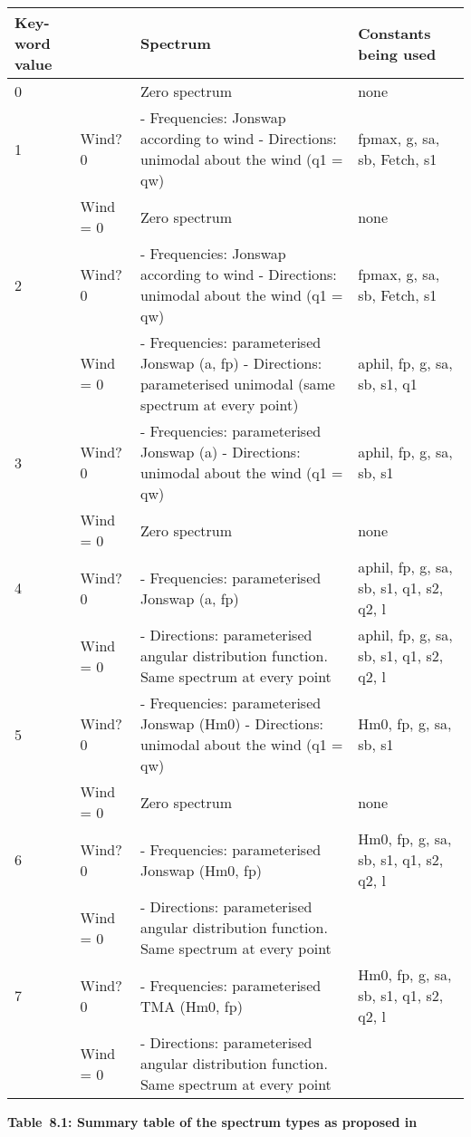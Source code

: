 \begin{tabular}{|p{0.5in}|p{0.5in}|p{2.2in}|p{0.8in}|} \hline
Key-word value &  & Spectrum & Constants being used \\ \hline
0 &  & Zero spectrum & none \\ \hline
1 & Wind? 0 & - Frequencies: Jonswap according to wind  - Directions: unimodal about the wind (q1 = qw) & fpmax, g, sa, sb, Fetch, s1 \\ \hline
 & Wind = 0 & Zero spectrum & none \\ \hline
2 & Wind? 0 & - Frequencies: Jonswap according to wind - Directions: unimodal about the wind (q1 = qw) & fpmax, g, sa, sb, Fetch, s1 \\ \hline
 & Wind = 0 & - Frequencies: parameterised Jonswap (a, fp) - Directions: parameterised unimodal (same spectrum at every point) & aphil, fp, g, sa, sb, s1, q1 \\ \hline
3 & Wind? 0 & - Frequencies: parameterised Jonswap (a) - Directions: unimodal about the wind (q1 = qw) & aphil, fp, g, sa, sb, s1 \\ \hline
 & Wind = 0 & Zero spectrum & none \\ \hline
4 & Wind? 0 & - Frequencies: parameterised Jonswap (a, fp) & aphil, fp, g, sa, sb, s1, q1, s2, q2, l \\ \hline
 & Wind = 0 & - Directions: parameterised angular distribution function. Same spectrum at every point & aphil, fp, g, sa, sb, s1, q1, s2, q2, l \\ \hline
5 & Wind? 0 & - Frequencies: parameterised Jonswap (Hm0) - Directions: unimodal about the wind  (q1 = qw) & Hm0, fp, g, sa, sb, s1 \\ \hline
 & Wind = 0 & Zero spectrum & none \\ \hline
6 & Wind? 0 & - Frequencies: parameterised Jonswap  (Hm0, fp) & Hm0, fp, g, sa, sb, s1, q1, s2, q2, l \\ \hline
 & Wind = 0 & - Directions: parameterised angular distribution function. Same spectrum at every point &  \\ \hline
7 & Wind? 0 & - Frequencies: parameterised TMA (Hm0, fp) & Hm0, fp, g, sa, sb, s1, q1, s2, q2, l \\ \hline
 & Wind = 0 & - Directions: parameterised angular distribution function. Same spectrum at every point &  \\ \hline
\end{tabular}

\textbf{Table~8.1: Summary table of the spectrum types as proposed in \tomawac}


